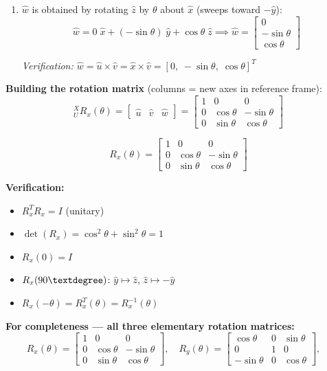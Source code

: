 \documentclass[12pt,a3paper]{article}
\begin{document}
\begin{enumerate}
\begin{tcolorbox}[enhanced,breakable,ansbox,colback=cB!4,colframe=cB,
  boxrule=0.8pt,arc=5pt,
  title={\textbf{Answer}},fonttitle=\bfseries\color{white},
  colbacktitle=cB]
\begin{enumerate}[label=\textbf{\arabic*.}]
  \item $\hat{w}$ is obtained by rotating $\hat{z}$ by $\theta$ about
    $\hat{x}$ (sweeps toward $-\hat{y}$):
    \[
      \hat{w} = 0\;\hat{x} + (-\sin\theta)\;\hat{y} + \cos\theta\;\hat{z}
      \implies
      \hat{w} = \begin{bmatrix}0\\-\sin\theta\\\cos\theta\end{bmatrix}
    \]

    \textit{Verification: $\hat{w} = \hat{u}\times\hat{v} =
    \hat{x}\times\hat{v} = [0,\;-\sin\theta,\;\cos\theta]^T$
    \checkmark}
\end{enumerate}

\textbf{Building the rotation matrix} (columns = new axes in reference
frame):
\[
  {}^X_UR_x(\theta)
  = \begin{bmatrix}\hat{u} & \hat{v} & \hat{w}\end{bmatrix}
  = \begin{bmatrix}
      1 & 0           &  0          \\
      0 & \cos\theta  & -\sin\theta \\
      0 & \sin\theta  &  \cos\theta
    \end{bmatrix}
\]

\[
  \boxed{R_x(\theta) =
  \begin{bmatrix}
    1 & 0           &  0          \\
    0 & \cos\theta  & -\sin\theta \\
    0 & \sin\theta  &  \cos\theta
  \end{bmatrix}}
\]

\textbf{Verification:}
\begin{itemize}[leftmargin=1.5em, itemsep=2pt]
  \item $R_x^T R_x = I$ (unitary) \checkmark
  \item $\det(R_x) = \cos^2\theta + \sin^2\theta = 1$ \checkmark
  \item $R_x(0) = I$ \checkmark
  \item $R_x(90\textdegree)$: $\hat{y} \mapsto \hat{z}$,
    $\hat{z} \mapsto -\hat{y}$ \checkmark
  \item $R_x(-\theta) = R_x^T(\theta) = R_x^{-1}(\theta)$ \checkmark
\end{itemize}

\textbf{For completeness — all three elementary rotation matrices:}
\[
  R_x(\theta) =
  \begin{bmatrix}
    1&0&0\\ 0&\cos\theta&-\sin\theta\\ 0&\sin\theta&\cos\theta
  \end{bmatrix}, \quad
  R_y(\theta) =
  \begin{bmatrix}
    \cos\theta&0&\sin\theta\\ 0&1&0\\ -\sin\theta&0&\cos\theta
  \end{bmatrix}, \quad
\]


\end{tcolorbox}
\end{enumerate}
\end{document}
